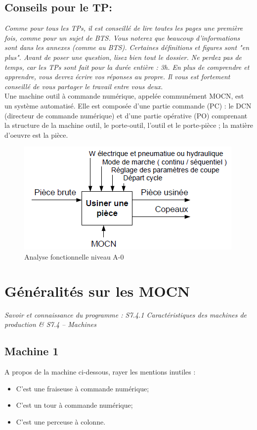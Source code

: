 \documentclass[12pt]{article}
\newcounter{exo}
\newenvironment{exo}{\stepcounter{exo}\vspace{0.5cm}{\bfseries Question \theexo\ :}}{\par\vspace{0.5cm}}
\begin{document}
\subsection*{Conseils pour le TP:}
\textit{Comme pour tous les TPs, il est conseillé de lire toutes les pages une première fois, comme pour un sujet de BTS. Vous noterez que beaucoup d'informations sont dans les annexes (comme au BTS). Certaines définitions et figures sont "en plus". Avant de poser une question, lisez bien tout le dossier. Ne perdez pas de temps, car les TPs sont fait pour la durée entière : 3h. En plus de comprendre et apprendre, vous devrez écrire vos réponses au propre. Il vous est fortement conseillé de vous partager le travail entre vous deux.}\\

Une machine outil à commande numérique, appelée communément MOCN, est un système
automatisé. Elle est composée d’une partie commande (PC) : le DCN (directeur de commande
numérique) et d’une partie opérative (PO) comprenant la structure de la machine outil, le porte-outil, l’outil et le porte-pièce ; la matière d’oeuvre est la pièce.
\begin{figure}
\centering
\includegraphics[width=0.7\linewidth]{A0.PNG}
\caption{Analyse fonctionnelle niveau A-0}
\label{A0}
\end{figure}
\section{Généralités sur les MOCN}
\textit{Savoir et connaissance du programme : S7.4.1 Caractéristiques des machines de production \& S7.4 – Machines}
\subsection{Machine 1}

\begin{exo}\label{exo1} A propos de la machine ci-dessous, rayer les mentions inutiles :
\begin{itemize}
    \item C'est une fraiseuse à commande numérique;
    \item C'est un tour à commande numérique;
    \item C'est une perceuse à colonne.
\end{itemize}
\end{exo}
\end{document}
